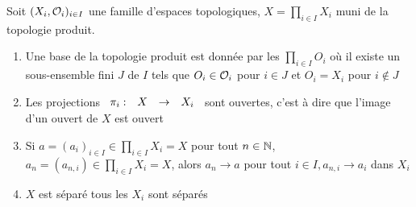 \documentclass[]{report}
\begin{document}
    \begin{prop}{}{}
        Soit $(X_i,\mathcal{O}_i)_{i\in I}$ une famille d'espaces topologiques, $X=\prod_{i\in I} X_i$ muni de la topologie produit.
        \begin{enumerate}
            \item Une base de la topologie produit est donnée par les $\prod_{i\in I}O_i$ où il existe un sous-ensemble fini $J$ de $I$ tels que $O_i\in\mathcal{O}_i$ pour $i\in J$ et $O_i=X_i$ pour $i\notin J$
            \item Les projections $\begin{array}{ccccc} \pi_i : & X & \to & X_i \end{array}$ sont ouvertes, c'est à dire que l'image d'un ouvert de $X$ est ouvert
            \item Si $a=(a_i)_{i\in I}\in \prod_{i\in I}X_i=X$ pour tout $n\in \mathbb{N}$, $a_n=(a_{n,i})\in \prod_{i\in I} X_i=X$, alors $a_n\to a$ \ssi pour tout $i\in I, a_{n,i}\to a_i$ dans $X_i$
            \item $X$ est séparé \ssi tous les $X_i$ sont séparés
        \end{enumerate}
    \end{prop}
\end{document}
